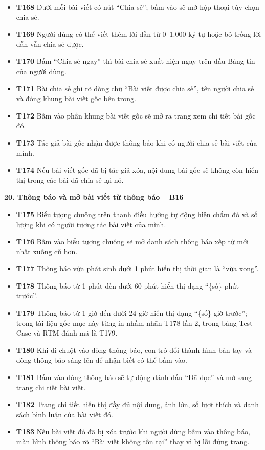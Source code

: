 \documentclass[11pt,a4paper]{article}
\begin{document}
\begin{itemize}[leftmargin=0.9cm, label=$\bullet$, itemsep=2pt, topsep=4pt]
    \item \textbf{T168} Dưới mỗi bài viết có nút ``Chia sẻ''; bấm vào sẽ mở hộp thoại tùy chọn chia sẻ.
    \item \textbf{T169} Người dùng có thể viết thêm lời dẫn từ 0--1.000 ký tự hoặc bỏ trống lời dẫn vẫn chia sẻ được.
    \item \textbf{T170} Bấm ``Chia sẻ ngay'' thì bài chia sẻ xuất hiện ngay trên đầu Bảng tin của người dùng.
    \item \textbf{T171} Bài chia sẻ ghi rõ dòng chữ ``Bài viết được chia sẻ'', tên người chia sẻ và đóng khung bài viết gốc bên trong.
    \item \textbf{T172} Bấm vào phần khung bài viết gốc sẽ mở ra trang xem chi tiết bài gốc đó.
    \item \textbf{T173} Tác giả bài gốc nhận được thông báo khi có người chia sẻ bài viết của mình.
    \item \textbf{T174} Nếu bài viết gốc đã bị tác giả xóa, nội dung bài gốc sẽ không còn hiển thị trong các bài đã chia sẻ lại nó.
\end{itemize}
\smallskip
\noindent\textbf{20. Thông báo và mở bài viết từ thông báo -- B16}
\begin{itemize}[leftmargin=0.9cm, label=$\bullet$, itemsep=2pt, topsep=4pt]
    \item \textbf{T175} Biểu tượng chuông trên thanh điều hướng tự động hiện chấm đỏ và số lượng khi có người tương tác bài viết của mình.
    \item \textbf{T176} Bấm vào biểu tượng chuông sẽ mở danh sách thông báo xếp từ mới nhất xuống cũ hơn.
    \item \textbf{T177} Thông báo vừa phát sinh dưới 1 phút hiển thị thời gian là ``vừa xong''.
    \item \textbf{T178} Thông báo từ 1 phút đến dưới 60 phút hiển thị dạng ``\{số\} phút trước''.
    \item \textbf{T179} Thông báo từ 1 giờ đến dưới 24 giờ hiển thị dạng ``\{số\} giờ trước''; trong tài liệu gốc mục này từng in nhầm nhãn T178 lần 2, trong bảng Test Case và RTM đánh mã là T179.
    \item \textbf{T180} Khi di chuột vào dòng thông báo, con trỏ đổi thành hình bàn tay và dòng thông báo sáng lên để nhận biết có thể bấm vào.
    \item \textbf{T181} Bấm vào dòng thông báo sẽ tự động đánh dấu ``Đã đọc'' và mở sang trang chi tiết bài viết.
    \item \textbf{T182} Trang chi tiết hiển thị đầy đủ nội dung, ảnh lớn, số lượt thích và danh sách bình luận của bài viết đó.
    \item \textbf{T183} Nếu bài viết đó đã bị xóa trước khi người dùng bấm vào thông báo, màn hình thông báo rõ ``Bài viết không tồn tại'' thay vì bị lỗi đứng trang.
\end{itemize}
\smallskip
\end{document}
